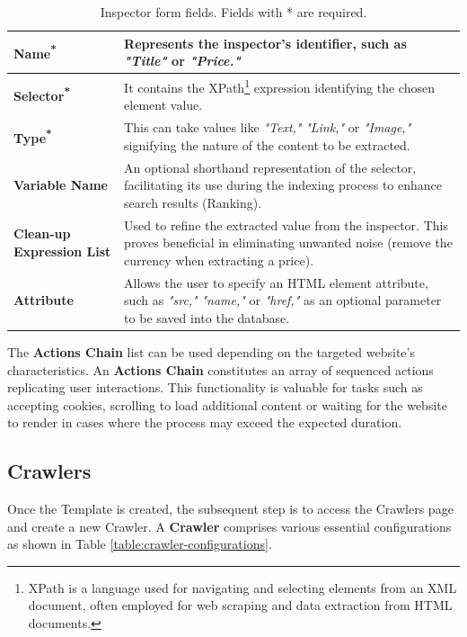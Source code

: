\begin{table}[ht]
\centering
{\footnotesize
\begin{tabular}{|P{2.5cm}|P{9.9cm}|}
    \hline
     \textbf{Name\textsuperscript{*}} & Represents the inspector's identifier, such as \textit{"Title"} or \textit{"Price."}  \\ \hline

     \textbf{Selector\textsuperscript{*}} & It contains the XPath\footnote{XPath is a language used for navigating and selecting elements from an XML document, often employed for web scraping and data extraction from HTML documents.} expression identifying the chosen element value.\\ \hline

     \textbf{Type\textsuperscript{*}} & This can take values like \textit{"Text,"} \textit{"Link,"} or \textit{"Image,"} signifying the nature of the content to be extracted.\\ \hline\hline

     \textbf{Variable Name} & An optional shorthand representation of the selector, facilitating its use during the indexing process to enhance search results (Ranking). \\ \hline

     \textbf{Clean-up Expression List} & Used to refine the extracted value from the inspector. This proves beneficial in eliminating unwanted noise (remove the currency when extracting a price).\\ \hline

     \textbf{Attribute} & Allows the user to specify an HTML element attribute, such as \textit{"src,"} \textit{"name,"} or \textit{"href,"} as an optional parameter to be saved into the database.\\ \hline
\end{tabular}}
  \captionsetup{justification=centering,margin=2cm}
  \caption{Inspector form fields. Fields with * are required.}
  \label{table:inspector-fields}
\end{table}


The \textbf{Actions Chain} list can be used depending on the targeted website's characteristics. An \textbf{Actions Chain} constitutes an array of sequenced actions replicating user interactions. This functionality is valuable for tasks such as accepting cookies, scrolling to load additional content or waiting for the website to render in cases where the process may exceed the expected duration. 

\subsection{Crawlers}
Once the Template is created, the subsequent step is to access the Crawlers page and create a new Crawler. A \textbf{Crawler} comprises various essential configurations as shown in Table \ref{table:crawler-configurations}.

